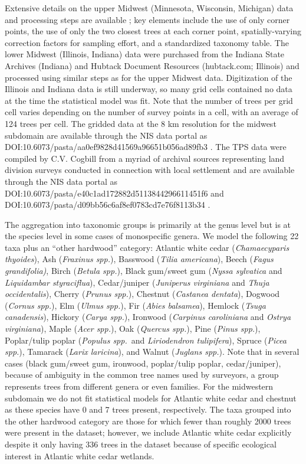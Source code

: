 \documentclass[10pt,letterpaper]{article}
\begin{document}
Extensive details on the upper Midwest (Minnesota, Wisconsin, Michigan)
data and processing steps are available \cite{goring2015composition};
key elements include the use of only corner points, the use of only
the two closest trees at each corner point, spatially-varying correction
factors for sampling effort, and a standardized taxonomy table. The
lower Midwest (Illinois, Indiana) data were purchased from the Indiana
State Archives (Indiana) and Hubtack Document Resources (hubtack.com;
Illinois) and processed using similar steps as for the upper Midwest
data. Digitization of the Illinois and Indiana data is still underway,
so many grid cells contained no data at the time the statistical model
was fit. Note that the number of trees per grid cell varies depending
on the number of survey points in a cell, with an average of 124 trees
per cell. The gridded data at the 8 km resolution for the midwest
subdomain are available through the NIS data portal as
DOI:10.6073/pasta/aa0ef9828d41569a96651b056ad89fb3 \cite{Gori:etal:data:2016}.
The TPS data were compiled by C.V. Cogbill from a myriad of archival
sources representing land division surveys conducted in connection
with local settlement and are available through the
NIS data portal as DOI:10.6073/pasta/e40c1ad172882d5113844296611451f6
and DOI:10.6073/pasta/d09bb56c6af8ef0783cd7e76f8113b34 \cite{Cogb:dataNE:2016,Cogb:dataOH:2016}. 

The aggregation into taxonomic groups is primarily at the genus level
but is at the species level in some cases of monospecific genera.
We model the following 22 taxa plus an ``other hardwood'' category:
Atlantic white cedar (\emph{Chamaecyparis thyoides}), Ash (\emph{Fraxinus
spp.}), Basswood (\emph{Tilia americana}), Beech (\emph{Fagus grandifolia)},
Birch (\emph{Betula spp.}), Black gum/sweet gum (\emph{Nyssa sylvatica}
and \emph{Liquidambar styraciflua}), Cedar/juniper (\emph{Juniperus
virginiana} and \emph{Thuja occidentalis}), Cherry (\emph{Prunus spp.}),
Chestnut (\emph{Castanea dentata}), Dogwood (\emph{Cornus spp.}),
Elm (\emph{Ulmus spp.}), Fir (\emph{Abies balsamea}), Hemlock (\emph{Tsuga
canadensis}), Hickory (\emph{Carya spp.}), Ironwood (\emph{Carpinus
caroliniana} and \emph{Ostrya virginiana}), Maple (\emph{Acer spp.}),
Oak (\emph{Quercus spp.}), Pine (\emph{Pinus spp.}), Poplar/tulip
poplar (\emph{Populus spp.}~and \emph{Liriodendron tulipifera}),
Spruce (\emph{Picea spp.}), Tamarack (\emph{Larix laricina}), and
Walnut (\emph{Juglans spp.}). Note that in several cases (black gum/sweet
gum, ironwood, poplar/tulip poplar, cedar/juniper), because of ambiguity
in the common tree names used by surveyors, a group represents trees
from different genera or even families. For the midwestern subdomain
we do not fit statistical models for Atlantic white cedar and chestnut
as these species have 0 and 7 trees present, respectively. The taxa
grouped into the other hardwood category are those for which fewer
than roughly 2000 trees were present in the dataset; however, we include
Atlantic white cedar explicitly despite it only having 336 trees in
the dataset because of specific ecological interest in Atlantic white
cedar wetlands. 
\end{document}
